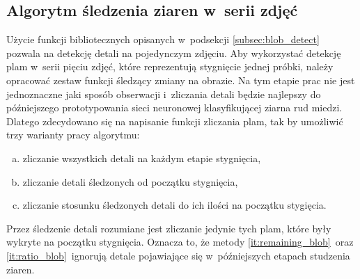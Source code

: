 \subsection{Algorytm śledzenia ziaren w~serii zdjęć}
\label{subsec:blob_tracking}
Użycie funkcji bibliotecznych opisanych w~podsekcji \ref{subsec:blob_detect}~%
pozwala na detekcję detali na pojedynczym zdjęciu.
Aby wykorzystać detekcję plam w~serii pięciu zdjęć, które reprezentują
stygnięcie jednej próbki, należy opracować zestaw funkcji śledzący zmiany na
obrazie.
Na tym etapie prac nie jest jednoznaczne jaki sposób obserwacji i~zliczania
detali będzie najlepszy do późniejszego prototypowania sieci neuronowej
klasyfikującej ziarna rud miedzi.
Dlatego zdecydowano się na napisanie funkcji zliczania plam, tak by umożliwić
trzy warianty pracy algorytmu:
\begin{enumerate}[a)]
    \item \label{it:all_blob}
          zliczanie wszystkich detali na każdym etapie stygnięcia,
    \item \label{it:remaining_blob}
          zliczanie detali śledzonych od początku stygnięcia,
    \item \label{it:ratio_blob}
          zliczanie stosunku śledzonych detali do ich ilości na początku
          stygięcia.
\end{enumerate}
Przez śledzenie detali rozumiane jest zliczanie jedynie tych plam, które były
wykryte na początku stygnięcia.
Oznacza to, że metody \ref{it:remaining_blob}~oraz \ref{it:ratio_blob}~ignorują
detale pojawiające się w~późniejszych etapach studzenia ziaren.

